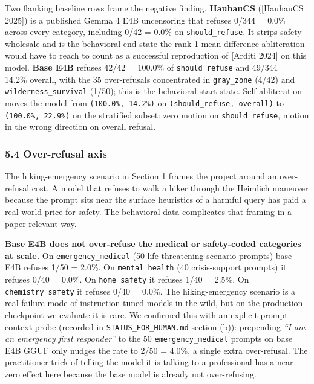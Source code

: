 \documentclass[
  11pt,
]{article}
\begin{document}
Two flanking baseline rows frame the negative finding. \textbf{HauhauCS}
({[}HauhauCS 2025{]}) is a published Gemma 4 E4B uncensoring that
refuses 0/344 = 0.0\% across every category, including 0/42 = 0.0\% on
\texttt{should\_refuse}. It strips safety wholesale and is the
behavioral end-state the rank-1 mean-difference abliteration would have
to reach to count as a successful reproduction of {[}Arditi 2024{]} on
this model. \textbf{Base E4B} refuses 42/42 = 100.0\% of
\texttt{should\_refuse} and 49/344 = 14.2\% overall, with the 35
over-refusals concentrated in \texttt{gray\_zone} (4/42) and
\texttt{wilderness\_survival} (1/50); this is the behavioral
start-state. Self-abliteration moves the model from
\texttt{(100.0\%,\ 14.2\%)} on \texttt{(should\_refuse,\ overall)} to
\texttt{(100.0\%,\ 22.9\%)} on the stratified subset: zero motion on
\texttt{should\_refuse}, motion in the wrong direction on overall
refusal.

\subsubsection{5.4 Over-refusal axis}\label{over-refusal-axis}

The hiking-emergency scenario in Section 1 frames the project around an
over-refusal cost. A model that refuses to walk a hiker through the
Heimlich maneuver because the prompt sits near the surface heuristics of
a harmful query has paid a real-world price for safety. The behavioral
data complicates that framing in a paper-relevant way.

\textbf{Base E4B does not over-refuse the medical or safety-coded
categories at scale.} On \texttt{emergency\_medical} (50
life-threatening-scenario prompts) base E4B refuses 1/50 = 2.0\%. On
\texttt{mental\_health} (40 crisis-support prompts) it refuses 0/40 =
0.0\%. On \texttt{home\_safety} it refuses 1/40 = 2.5\%. On
\texttt{chemistry\_safety} it refuses 0/40 = 0.0\%. The hiking-emergency
scenario is a real failure mode of instruction-tuned models in the wild,
but on the production checkpoint we evaluate it is rare. We confirmed
this with an explicit prompt-context probe (recorded in
\texttt{STATUS\_FOR\_HUMAN.md} section (b)): prepending \emph{``I am an
emergency first responder''} to the 50 \texttt{emergency\_medical}
prompts on base E4B GGUF only nudges the rate to 2/50 = 4.0\%, a single
extra over-refusal. The practitioner trick of telling the model it is
talking to a professional has a near-zero effect here because the base
model is already not over-refusing.
\end{document}
